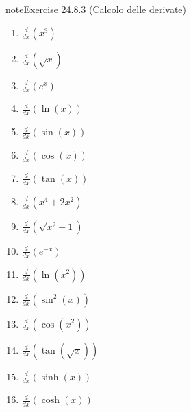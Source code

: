 \documentclass[letterpaper,10pt,italian]{jupyterBook}
\begin{document}
\begin{sphinxadmonition}{note}{Exercise 24.8.3 (Calcolo delle derivate)}


\begin{enumerate}
%
\item {} 
\sphinxAtStartPar
\(\frac{d}{dx} \left(x^3\right)\)

\item {} 
\sphinxAtStartPar
\(\frac{d}{dx} \left(\sqrt{x}\right)\)

\item {} 
\sphinxAtStartPar
\(\frac{d}{dx} \left(e^x\right)\)

\item {} 
\sphinxAtStartPar
\(\frac{d}{dx} \left(\ln(x)\right)\)

\item {} 
\sphinxAtStartPar
\(\frac{d}{dx} \left(\sin(x)\right)\)

\item {} 
\sphinxAtStartPar
\(\frac{d}{dx} \left(\cos(x)\right)\)

\item {} 
\sphinxAtStartPar
\(\frac{d}{dx} \left(\tan(x)\right)\)

\item {} 
\sphinxAtStartPar
\(\frac{d}{dx} \left(x^4 + 2x^2\right)\)

\item {} 
\sphinxAtStartPar
\(\frac{d}{dx} \left(\sqrt{x^2 + 1}\right)\)

\item {} 
\sphinxAtStartPar
\(\frac{d}{dx} \left(e^{-x}\right)\)

\item {} 
\sphinxAtStartPar
\(\frac{d}{dx} \left(\ln(x^2)\right)\)

\item {} 
\sphinxAtStartPar
\(\frac{d}{dx} \left(\sin^2(x)\right)\)

\item {} 
\sphinxAtStartPar
\(\frac{d}{dx} \left(\cos(x^2)\right)\)

\item {} 
\sphinxAtStartPar
\(\frac{d}{dx} \left(\tan(\sqrt{x})\right)\)

\item {} 
\sphinxAtStartPar
\(\frac{d}{dx} \left(\sinh(x)\right)\)

\item {} 
\sphinxAtStartPar
\(\frac{d}{dx} \left(\cosh(x)\right)\)


\end{enumerate}
\end{sphinxadmonition}
\end{document}
